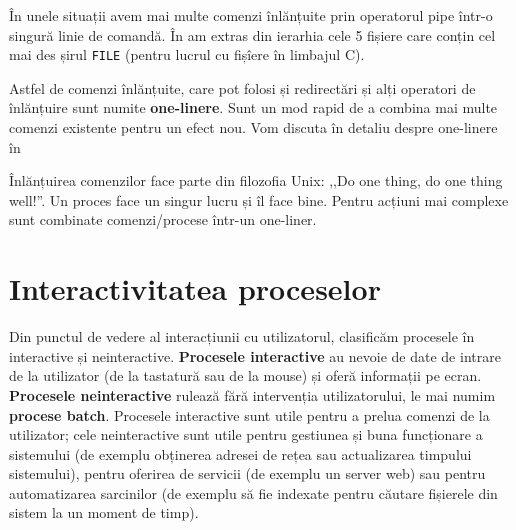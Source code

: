În unele situații avem mai multe comenzi înlănțuite prin operatorul pipe într-o singură linie de comandă.
În  am extras din ierarhia  cele 5 fișiere care conțin cel mai des șirul \texttt{FILE} (pentru lucrul cu fișîere în limbajul C).


Astfel de comenzi înlănțuite, care pot folosi și redirectări și alți operatori de înlănțuire sunt numite \textbf{one-linere}.
Sunt un mod rapid de a combina mai multe comenzi existente pentru un efect nou.
Vom discuta în detaliu despre one-linere în 

\begin{note}
  Înlănțuirea comenzilor face parte din filozofia Unix: ,,Do one thing, do one thing well!''.
  Un proces face un singur lucru și îl face bine.
  Pentru acțiuni mai complexe sunt combinate comenzi/procese într-un one-liner.
\end{note}

\section{Interactivitatea proceselor}
\label{sec:process:interactivity}

Din punctul de vedere al interacțiunii cu utilizatorul, clasificăm procesele în interactive și neinteractive.
\textbf{Procesele interactive} au nevoie de date de intrare de la utilizator (de la tastatură sau de la mouse) și oferă informații pe ecran.
\textbf{Procesele neinteractive} rulează fără intervenția utilizatorului, le mai numim \textbf{procese batch}.
Procesele interactive sunt utile pentru a prelua comenzi de la utilizator;
cele neinteractive sunt utile pentru gestiunea și buna funcționare a sistemului (de exemplu obținerea adresei de rețea sau actualizarea timpului sistemului), pentru oferirea de servicii (de exemplu un server web) sau pentru automatizarea sarcinilor (de exemplu să fie indexate pentru căutare fișierele din sistem la un moment de timp).

